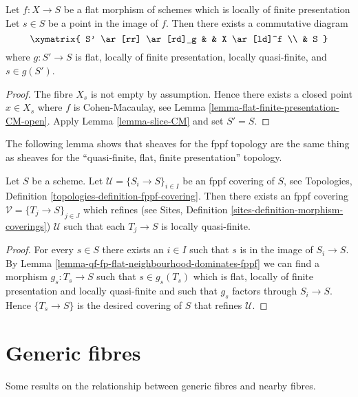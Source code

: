 \begin{lemma}
\label{lemma-qf-fp-flat-neighbourhood-dominates-fppf}
Let $f : X \to S$ be a flat morphism of schemes which is
locally of finite presentation Let $s \in S$ be a point in the image of $f$.
Then there exists a commutative diagram
$$
\xymatrix{
S' \ar[rr] \ar[rd]_g & & X \ar[ld]^f \\
& S
}
$$
where $g : S' \to S$ is flat, locally of finite presentation,
locally quasi-finite, and $s \in g(S')$.
\end{lemma}

\begin{proof}
The fibre $X_s$ is not empty by assumption. Hence there exists a closed
point $x \in X_s$ where $f$ is Cohen-Macaulay, see
Lemma \ref{lemma-flat-finite-presentation-CM-open}.
Apply
Lemma \ref{lemma-slice-CM}
and set $S' = S$.
\end{proof}

\noindent
The following lemma shows that sheaves for the fppf topology are
the same thing as sheaves for the
``quasi-finite, flat, finite presentation'' topology.

\begin{lemma}
\label{lemma-qf-fp-flat-dominates-fppf}
Let $S$ be a scheme. Let $\mathcal{U} = \{S_i \to S\}_{i \in I}$ be an fppf
covering of $S$, see
Topologies, Definition \ref{topologies-definition-fppf-covering}.
Then there exists an fppf covering $\mathcal{V} = \{T_j \to S\}_{j \in J}$
which refines (see
Sites, Definition \ref{sites-definition-morphism-coverings})
$\mathcal{U}$ such that each $T_j \to S$ is locally quasi-finite.
\end{lemma}

\begin{proof}
For every $s \in S$ there exists an $i \in I$ such that $s$ is in
the image of $S_i \to S$. By
Lemma \ref{lemma-qf-fp-flat-neighbourhood-dominates-fppf}
we can find a morphism $g_s : T_s \to S$ such that $s \in g_s(T_s)$
which is flat, locally of finite presentation and locally quasi-finite
and such that $g_s$ factors through $S_i \to S$. Hence
$\{T_s \to S\}$ is the desired covering of $S$ that refines $\mathcal{U}$.
\end{proof}



\section{Generic fibres}
\label{section-generic}

\noindent
Some results on the relationship between generic fibres and
nearby fibres.

